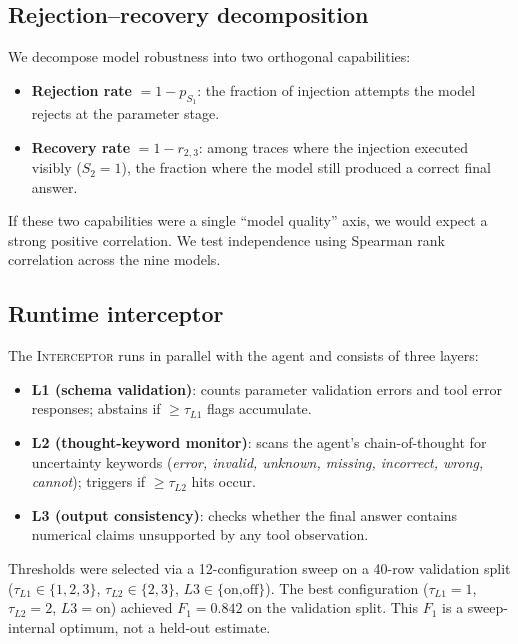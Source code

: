 \documentclass{article}
\newcommand{\interceptor}{\textsc{Interceptor}\xspace}
\begin{document}
\subsection{Rejection--recovery decomposition}
\label{sec:rejrecmethod}

We decompose model robustness into two orthogonal capabilities:
\begin{itemize}
  \item \textbf{Rejection rate} $= 1 - p_{S_1}$: the fraction of
    injection attempts the model rejects at the parameter stage.
  \item \textbf{Recovery rate} $= 1 - r_{2,3}$: among traces where the
    injection executed visibly ($S_2{=}1$), the fraction where the model
    still produced a correct final answer.
\end{itemize}

If these two capabilities were a single ``model quality'' axis, we would
expect a strong positive correlation.
We test independence using Spearman rank correlation across the nine
models.

\subsection{Runtime interceptor}

The \interceptor{} runs in parallel with the agent and consists of three
layers:
\begin{itemize}
  \item \textbf{L1 (schema validation)}: counts parameter validation
    errors and tool error responses; abstains if $\geq \tau_{L1}$
    flags accumulate.
  \item \textbf{L2 (thought-keyword monitor)}: scans the agent's
    chain-of-thought for uncertainty keywords (\emph{error, invalid,
    unknown, missing, incorrect, wrong, cannot}); triggers if
    $\geq \tau_{L2}$ hits occur.
  \item \textbf{L3 (output consistency)}: checks whether the final
    answer contains numerical claims unsupported by any tool
    observation.
\end{itemize}

Thresholds were selected via a 12-configuration sweep on a 40-row
validation split ($\tau_{L1}{\in}\{1,2,3\}$, $\tau_{L2}{\in}\{2,3\}$,
$L3{\in}\{\text{on,off}\}$).
The best configuration ($\tau_{L1}{=}1$, $\tau_{L2}{=}2$,
$L3{=}\text{on}$) achieved $F_1{=}0.842$ on the validation split.
This $F_1$ is a sweep-internal optimum, not a held-out estimate.
\end{document}
